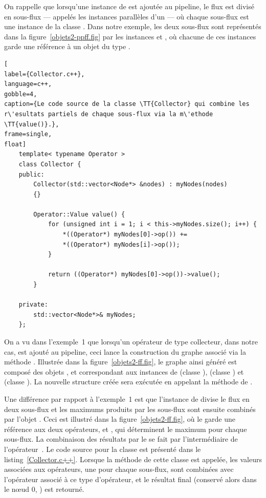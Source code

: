 On rappelle que lorsqu'une instance de  est ajout\'ee au {pipeline}, le flux est divis\'e en sous-flux --- appel\'es les instances parall\`eles d'un  --- o\`u chaque sous-flux est une instance de la classe . Dans notre exemple, les deux sous-flux sont représent\'es dans la figure~\ref{objets2-ppff.fig} par les instances  et , o\`u chacune de ces instances garde une r\'ef\'erence \`a un objet du type . 


\begin{lstlisting}[
label={Collector.c++},
language=c++,
gobble=4,
caption={Le code source de la classe \TT{Collector} qui combine les r\'esultats partiels de chaque sous-flux via la m\'ethode \TT{value()}.},
frame=single,
float]
    template< typename Operator >
    class Collector {
    public:
        Collector(std::vector<Node*> &nodes) : myNodes(nodes)
        {}
        
        Operator::Value value() {
            for (unsigned int i = 1; i < this->myNodes.size(); i++) {
                *((Operator*) myNodes[0]->op()) += 
                *((Operator*) myNodes[i]->op());
            }

            return ((Operator*) myNodes[0]->op())->value();
        }

    private:
        std::vector<Node*>& myNodes;
    };
\end{lstlisting}


On a vu dans l'exemple~1 que lorsqu'un op\'erateur de type collecteur,  dans notre cas, est ajout\'e au {pipeline}, ceci lance la construction du graphe  associ\'e via la m\'ethode . Illustr\'ee dans la figure~\ref{objets2-ff.fig}, le graphe ainsi g\'en\'er\'e est compos\'e des objets ,  et  correspondant aux instances de   (classe ),  (classe ) et  (classe ). La nouvelle structure cr\'e\'ee sera ex\'ecut\'ee en appelant la m\'ethode  de . 

Une différence par rapport \`a l'exemple~1 est que l'instance de  divise le flux en deux sous-flux et les maximums produits par les sous-flux sont ensuite combin\'es par l'objet . Ceci est illustr\'e dans la figure~\ref{objets2-ff.fig}, o\`u le  garde une r\'ef\'erence aux deux op\'erateurs,  et , qui d\'eterminent le maximum pour chaque sous-flux. La combinaison des r\'esultats par le  se fait par l'interm\'ediaire de l'opérateur~\TT{+=()}. Le code source pour la classe  est pr\'esent\'e dans le listing~\ref{Collector.c++}. Lorsque la m\'ethode  de cette classe est appel\'ee, les valeurs associées aux op\'erateurs, une pour chaque sous-flux, sont combin\'ees avec l'opérateur \TT{+=()} associé à ce type d'opérateur, et le r\'esultat final (conservé alors dans le n\oe{}ud 0, ) est retourn\'e.




